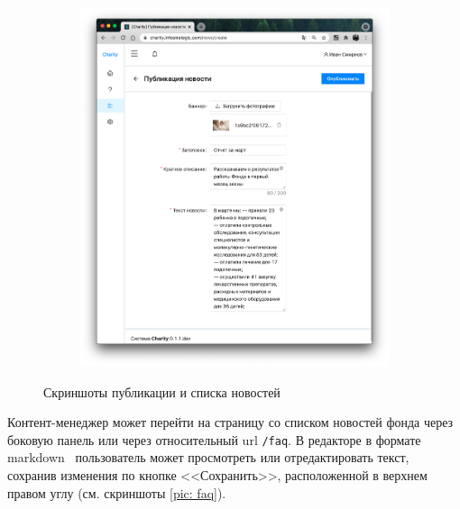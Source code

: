 \documentclass[a4paper,12pt,reqno]{article}
\begin{document}
\begin{figure}[H]
\begin{subfigure}[b]{0.475\linewidth}
			\includegraphics[width=\linewidth]{img/ro/news_publish.png}
		\end{subfigure}
		\caption{Скриншоты публикации и списка новостей}
		\label{pic: news}
	\end{figure}
	
	Контент-менеджер может перейти на страницу со списком новостей фонда через боковую панель или через относительный url \texttt{/faq}. В редакторе в формате markdown~\cite{md} пользователь может просмотреть или отредактировать текст, сохранив изменения по кнопке <<Сохранить>>, расположенной в верхнем правом углу (см. скриншоты \ref{pic: faq}).
	
\end{document}
